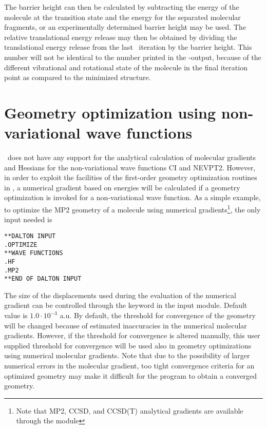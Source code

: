 The barrier height can then be calculated by subtracting the energy of
the molecule at the transition state and the energy for the separated
molecular fragments, or an experimentally determined barrier height
may be used. The relative translational energy release may then be
obtained  by dividing the translational energy release
from the last \dalton\ iteration by the barrier height. This number will
not be identical to the number printed in the \dalton -output, because
of the different vibrational and rotational state of
the molecule in the final iteration point as compared to the minimized
structure.

\section{Geometry optimization using non-variational wave
functions}\label{sec:nonvargeom}

\dalton\ does not have any support for the analytical calculation of molecular
gradients and Hessians for the non-variational wave functions 
CI and NEVPT2. However, in order to
exploit the facilities of the first-order
geometry optimization routines in {\dalton}, a numerical
gradient based
on energies will be calculated if a geometry optimization is invoked
for a non-variational wave function. As a simple example, to optimize
the MP2 geometry of a molecule using numerical gradients\footnote{Note
that MP2, CCSD, and CCSD(T) analytical gradients are available through the {\cc}
module}, the only input needed is

\begin{verbatim}
**DALTON INPUT
.OPTIMIZE
**WAVE FUNCTIONS
.HF
.MP2
**END OF DALTON INPUT
\end{verbatim}

The size of the displacements used during the evaluation of the
numerical gradient can be controlled through the keyword
 in the  input module. Default value is
$1.0\cdot 10^{-3}$ a.u. By default, the threshold for convergence
of the geometry will be changed because of estimated inaccuracies
in the numerical molecular gradients. However, if the threshold for
convergence is altered manually, this user supplied threshold for
convergence will be used also in geometry optimizations using
numerical molecular gradients. Note that due to
the possibility of larger numerical errors in the molecular gradient, too
tight convergence criteria for an optimized geometry may make it
difficult for the program to obtain a converged geometry.
